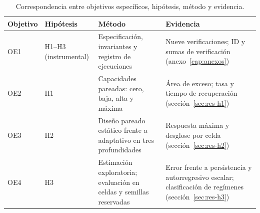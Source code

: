 \begin{table}[H]
\centering
\caption{Correspondencia entre objetivos específicos, hipótesis, método y evidencia.}
\label{tab:oe-h}
\footnotesize
\setlength{\tabcolsep}{3pt}
\renewcommand{\arraystretch}{1.0}
\begin{tabularx}{\textwidth}{@{}l l >{\raggedright\arraybackslash}X >{\raggedright\arraybackslash}X@{}}
\toprule
Objetivo & Hipótesis & Método & Evidencia \\
\midrule
OE1 & H1--H3 (instrumental) & Especificación, invariantes y registro de ejecuciones & Nueve verificaciones; ID y sumas de verificación (anexo~\ref{cap:anexos}) \\
OE2 & H1 & Capacidades pareadas: cero, baja, alta y máxima & Área de exceso; tasa y tiempo de recuperación (sección~\ref{sec:res-h1}) \\
OE3 & H2 & Diseño pareado estático frente a adaptativo en tres profundidades & Respuesta máxima y desglose por celda (sección~\ref{sec:res-h2}) \\
OE4 & H3 & Estimación exploratoria; evaluación en celdas y semillas reservadas & Error frente a persistencia y autorregresivo escalar; clasificación de regímenes (sección~\ref{sec:res-h3}) \\
\bottomrule
\end{tabularx}
\end{table}
